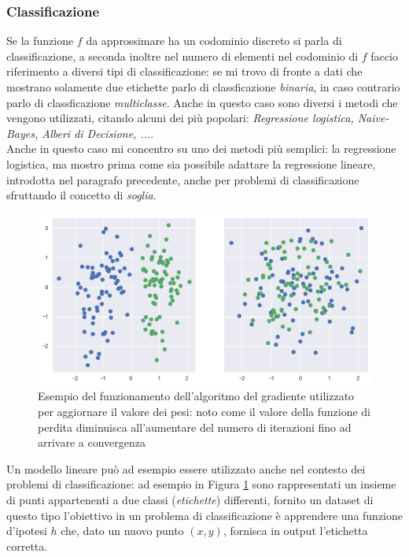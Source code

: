 \documentclass[../../main.tex]{subfiles}
\begin{document}
    \subsubsection{Classificazione} 
    

    Se la funzione $f$ da approssimare ha un codominio discreto si parla di classificazione, a seconda inoltre nel numero di elementi nel codominio di $f$ faccio riferimento a diversi tipi di classificazione: se mi trovo di fronte a dati che mostrano solamente due etichette parlo di classficazione \textit{binaria}, in caso contrario parlo di classficazione \textit{multiclasse}. Anche in questo caso sono diversi i metodi che vengono utilizzati, citando alcuni dei più popolari: \textit{Regressione logistica, Naive-Bayes, Alberi di Decisione, ...}.\\
    Anche in questo caso mi concentro su uno dei metodi più semplici: la regressione logistica, ma mostro prima come sia possibile adattare la regressione lineare, introdotta nel paragrafo precedente, anche per problemi di classificazione sfruttando il concetto di \textit{soglia}.

    \begin{figure}[H]
        \centering
        \includegraphics[scale = 0.6]{immagini/4_1/classification_datasets.png}
        \caption{Esempio del funzionamento dell'algoritmo del gradiente utilizzato per aggiornare il valore dei pesi: noto come il valore della funzione di perdita diminuisca all'aumentare del numero di iterazioni fino ad arrivare a convergenza}
        \label{fig:classification_datasets}
    \end{figure}

    Un modello lineare può ad esempio essere utilizzato anche nel contesto dei problemi di classificazione: ad esempio in Figura \ref{fig:classification_datasets} sono rappresentati un insieme di punti appartenenti a due classi (\textit{etichette}) differenti, fornito un dataset di questo tipo l'obiettivo in un problema di classificazione è apprendere una funzione d'ipotesi $h$ che, dato un nuovo punto $(x, y)$, fornisca in output l'etichetta corretta.
    
\end{document}
